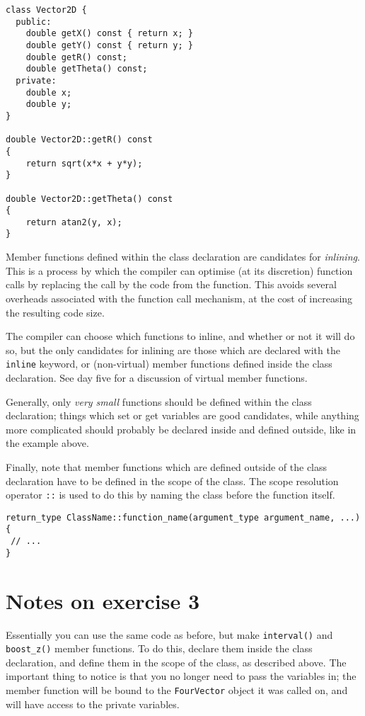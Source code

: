 \documentclass[a4paper]{scrartcl}
\begin{document}
\begin{verbatim}
class Vector2D {
  public:
    double getX() const { return x; }
    double getY() const { return y; }
    double getR() const;
    double getTheta() const;
  private:
    double x;
    double y;
}

double Vector2D::getR() const
{
    return sqrt(x*x + y*y);
}

double Vector2D::getTheta() const
{
    return atan2(y, x);
}
\end{verbatim}

Member functions defined within the class declaration are candidates for \emph{inlining}. This is a process by which the compiler can optimise (at its discretion) function calls by replacing the call by the code from the function. This avoids several overheads associated with the function call mechanism, at the cost of increasing the resulting code size.

The compiler can choose which functions to inline, and whether or not it will do so, but the only candidates for inlining are those which are declared with the \verb|inline| keyword, or (non-virtual) member functions defined inside the class declaration. See day five for a discussion of virtual member functions.

Generally, only \emph{very small} functions should be defined within the class declaration; things which set or get variables are good candidates, while anything more complicated should probably be declared inside and defined outside, like in the example above.

Finally, note that member functions which are defined outside of the class declaration have to be defined in the scope of the class. The scope resolution operator \verb|::| is used to do this by naming the class before the function itself.

\begin{verbatim}
return_type ClassName::function_name(argument_type argument_name, ...)
{
 // ...
}
\end{verbatim}

\section{Notes on exercise 3}
Essentially you can use the same code as before, but make \verb|interval()| and \verb|boost_z()| member functions. To do this, declare them inside the class declaration, and define them in the scope of the class, as described above. The important thing to notice is that you no longer need to pass the variables in; the member function will be bound to the \verb|FourVector| object it was called on, and will have access to the private variables.
\end{document}
